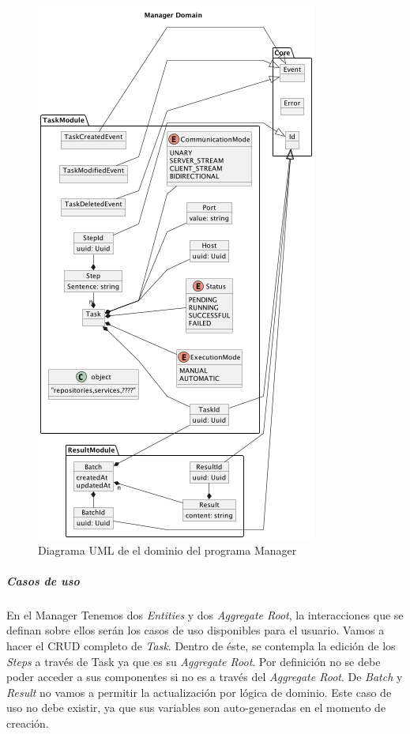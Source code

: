 \begin{figure}[H]
    \centering
    \includegraphics[height=0.5\textheight]{./part/Proyecto_ejecutivo/memoria_descriptiva/descripcionDelProyecto/manager/uml/managerDomain}
    \caption{Diagrama UML de el dominio del programa Manager}\label{fig:Diagrama UML de el dominio de manager}
\end{figure}

\subparagraph{Casos de uso}

En el Manager Tenemos dos \textit{Entities} y dos \textit{Aggregate Root}, la interacciones que se definan sobre ellos serán los casos de uso disponibles para el usuario.
Vamos a hacer el \gls{CRUD} completo de \textit{Task}.
Dentro de éste, se contempla la edición de los \textit{Steps} a través de Task ya que es su \textit{Aggregate Root}.
Por definición no se debe poder acceder a sus componentes si no es a través del \textit{Aggregate Root}.
De \textit{Batch} y \textit{Result} no vamos a permitir la actualización por lógica de dominio.
Este caso de uso no debe existir, ya que sus variables son auto-generadas en el momento de creación.

